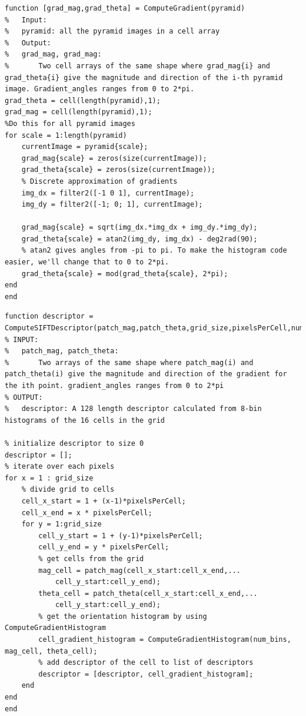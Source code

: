 \documentclass{article}
\begin{document}
\begin{lstlisting}[caption={My implementation of ComputeGradient function.},captionpos=b]
function [grad_mag,grad_theta] = ComputeGradient(pyramid)
%   Input:
%   pyramid: all the pyramid images in a cell array
%   Output:
%   grad_mag, grad_mag:
%       Two cell arrays of the same shape where grad_mag{i} and grad_theta{i} give the magnitude and direction of the i-th pyramid image. Gradient_angles ranges from 0 to 2*pi.
grad_theta = cell(length(pyramid),1);
grad_mag = cell(length(pyramid),1);
%Do this for all pyramid images
for scale = 1:length(pyramid)    
    currentImage = pyramid{scale};
    grad_mag{scale} = zeros(size(currentImage));
    grad_theta{scale} = zeros(size(currentImage));    
    % Discrete approximation of gradients
    img_dx = filter2([-1 0 1], currentImage);
    img_dy = filter2([-1; 0; 1], currentImage);
            
    grad_mag{scale} = sqrt(img_dx.*img_dx + img_dy.*img_dy);
    grad_theta{scale} = atan2(img_dy, img_dx) - deg2rad(90);        
    % atan2 gives angles from -pi to pi. To make the histogram code easier, we'll change that to 0 to 2*pi.
    grad_theta{scale} = mod(grad_theta{scale}, 2*pi);
end
end
\end{lstlisting}

\begin{lstlisting}[caption={My implementation for ComputeSIFTDescriptor function.},captionpos=b]
function descriptor = ComputeSIFTDescriptor(patch_mag,patch_theta,grid_size,pixelsPerCell,num_bins)
% INPUT:
%   patch_mag, patch_theta:
%       Two arrays of the same shape where patch_mag(i) and patch_theta(i) give the magnitude and direction of the gradient for the ith point. gradient_angles ranges from 0 to 2*pi
% OUTPUT:
%   descriptor: A 128 length descriptor calculated from 8-bin histograms of the 16 cells in the grid

% initialize descriptor to size 0
descriptor = [];
% iterate over each pixels
for x = 1 : grid_size
    % divide grid to cells
    cell_x_start = 1 + (x-1)*pixelsPerCell;
    cell_x_end = x * pixelsPerCell;
    for y = 1:grid_size
        cell_y_start = 1 + (y-1)*pixelsPerCell;
        cell_y_end = y * pixelsPerCell;
        % get cells from the grid
        mag_cell = patch_mag(cell_x_start:cell_x_end,...
            cell_y_start:cell_y_end);
        theta_cell = patch_theta(cell_x_start:cell_x_end,...
            cell_y_start:cell_y_end);
        % get the orientation histogram by using ComputeGradientHistogram
        cell_gradient_histogram = ComputeGradientHistogram(num_bins, mag_cell, theta_cell);
        % add descriptor of the cell to list of descriptors
        descriptor = [descriptor, cell_gradient_histogram];
    end
end
end
\end{lstlisting}
\end{document}
